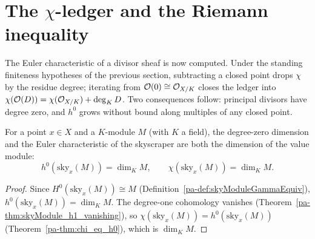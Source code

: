 \section{The \texorpdfstring{\(\chi\)}{chi}-ledger and the Riemann inequality}

The Euler characteristic of a divisor sheaf is now computed. Under the standing finiteness
hypotheses of the previous section, subtracting a closed point drops \(\chi\) by the residue
degree; iterating from \(\mathcal O(0) \cong \mathcal{O}_{X/K}\) closes the ledger into
\(\chi(\mathcal O(D)) = \chi(\mathcal{O}_{X/K}) + \deg_K D\). Two consequences follow: principal
divisors have degree zero, and \(h^0\) grows without bound along multiples of any closed point.

\begin{theorem}
  \label{pa-thm:chi_skyModule}
  \leanok

  For a point \(x \in X\) and a \(K\)-module \(M\) (with \(K\) a field), the degree-zero
  dimension and the Euler characteristic of the skyscraper are both the dimension of the value
  module:
  \[
    h^0(\mathrm{sky}_x(M)) = \dim_K M, \qquad \chi(\mathrm{sky}_x(M)) = \dim_K M .
  \]
\end{theorem}
\begin{proof}
  \leanok
  Since \(H^0(\mathrm{sky}_x(M)) \cong M\) (Definition~\ref{pa-def:skyModuleGammaEquiv}),
  \(h^0(\mathrm{sky}_x(M)) = \dim_K M\). The degree-one cohomology vanishes
  (Theorem~\ref{pa-thm:skyModule_h1_vanishing}), so
  \(\chi(\mathrm{sky}_x(M)) = h^0(\mathrm{sky}_x(M))\) (Theorem~\ref{pa-thm:chi_eq_h0}), which is
  \(\dim_K M\).
\end{proof}

